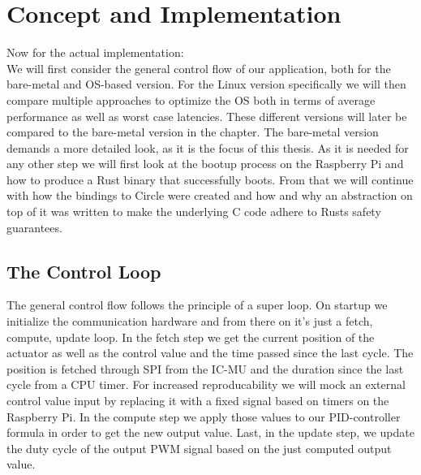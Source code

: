 
\begin{comment}
    Super loop:
    1. Fetch current control value and feedback from system
    2. Calculate new output value accordingly
    3. Adjust output (PWM)
    
    PD or PDI Control?
    
    
    Bare-metal vs
    Preempt-RT vs
    linux
\end{comment}

\chapter{Concept and Implementation}
\label{chap:concept_and_implementation}

Now for the actual implementation:\\
We will first consider the general control flow of our application, both for the bare-metal and OS-based version.
For the Linux version specifically we will then compare multiple approaches to optimize the OS both in terms of average performance as well as worst case latencies.
These different versions will later be compared to the bare-metal version in the  chapter.
The bare-metal version demands a more detailed look, as it is the focus of this thesis.
As it is needed for any other step we will first look at the bootup process on the Raspberry Pi and how to produce a Rust binary that successfully boots.
From that we will continue with how the bindings to Circle were created and how and why an abstraction on top of it was written to make the underlying C code adhere to Rusts safety guarantees.

\section{The Control Loop}
\label{sec:concept_and_implementation:control_flow}

The general control flow follows the principle of a super loop.
On startup we initialize the communication hardware and from there on it's just a fetch, compute, update loop.
In the fetch step we get the current position of the actuator as well as the control value and the time passed since the last cycle.
The position is fetched through SPI from the IC-MU and the duration since the last cycle from a CPU timer.
For increased reproducability we will mock an external control value input by replacing it with a fixed signal based on timers on the Raspberry Pi.
In the compute step we apply those values to our PID-controller formula in order to get the new output value.
Last, in the update step, we update the duty cycle of the output PWM signal based on the just computed output value.


